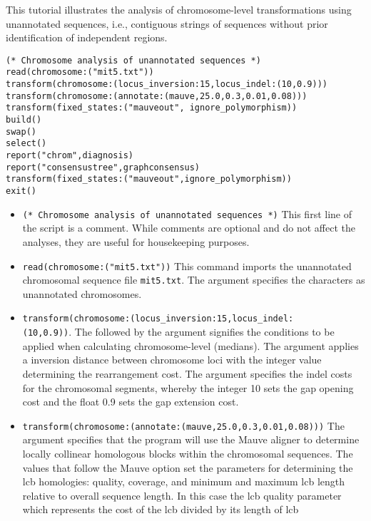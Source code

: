This tutorial illustrates the analysis of chromosome-level transformations using 
unannotated sequences, i.e., contiguous strings of sequences without prior 
identification of independent regions. 

\begin{verbatim}
(* Chromosome analysis of unannotated sequences *)
read(chromosome:("mit5.txt"))
transform(chromosome:(locus_inversion:15,locus_indel:(10,0.9)))
transform(chromosome:(annotate:(mauve,25.0,0.3,0.01,0.08)))
transform(fixed_states:("mauveout", ignore_polymorphism))
build()
swap()
select()
report("chrom",diagnosis)
report("consensustree",graphconsensus)
transform(fixed_states:("mauveout",ignore_polymorphism))
exit()
\end{verbatim}

\begin{itemize}
\item \texttt{(* Chromosome analysis of unannotated sequences *)} This first line of the script is a comment. While 
comments are optional and do not affect the analyses, they are useful for housekeeping purposes.
\item \texttt{read(chromosome:("mit5.txt"))} This command imports the unannotated chromosomal sequence file 
\texttt{mit5.txt}. The argument  specifies the characters as unannotated chromosomes.
\item \texttt{transform(chromosome:(locus\_inversion:15,locus\_indel:\\(10,0.9))}.  The  
followed by the argument  signifies the conditions to be applied when calculating 
chromosome-level (medians).  The argument  applies a inversion distance 
between chromosome loci with the integer value determining the rearrangement cost. The argument 
 specifies the indel costs for the chromosomal segments, whereby the integer 10 
sets the gap opening cost and the float 0.9 sets the gap extension cost.
\item \texttt{transform(chromosome:(annotate:(mauve,25.0,0.3,0.01,0.08)))} The argument  specifies that the program will use the Mauve aligner \cite{darlingetal2004} to determine locally collinear 
homologous blocks within the chromosomal sequences.  The values that follow the Mauve option set the parameters 
for determining the lcb homologies: quality, coverage, and minimum and maximum lcb length relative to overall 
sequence length. In this case the lcb quality parameter which represents the cost of the lcb divided by its length of lcb 

\end{itemize}
